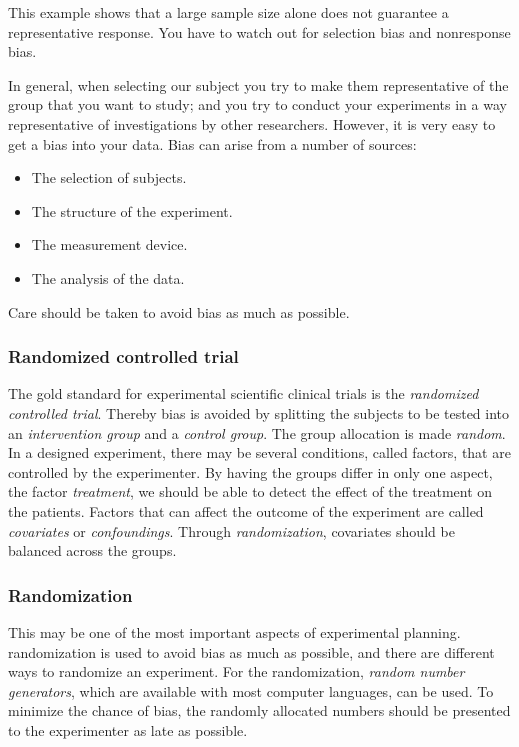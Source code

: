This example shows that a large sample size alone does not guarantee a representative response. You have to watch out for selection bias and nonresponse bias.

In general, when selecting our subject you try to make them representative of the group that you want to study; and you try to conduct your experiments in a way representative of investigations by other researchers. However, it is very easy to get a bias into your data. Bias can arise from a number of sources:

\begin{itemize}
  \item The selection of subjects.
  \item The structure of the experiment.
  \item The measurement device.
  \item The analysis of the data.
\end{itemize}

Care should be taken to avoid bias as much as possible.

\subsubsection{Randomized controlled trial} 
The gold standard for experimental scientific clinical trials is the \emph{randomized controlled trial}. Thereby bias is avoided by splitting the subjects to be tested into an \emph{intervention group} and a \emph{control group}. The group allocation is made \emph{random}.
In a designed experiment, there may be several conditions, called factors, that are controlled by the experimenter. By having the groups differ in only one aspect, the factor \emph{treatment}, we should be able to detect the effect of the treatment on the patients.
Factors that can affect the outcome of the experiment are called \emph{covariates} or \emph{confoundings}. Through \emph{randomization}, covariates should be balanced across the groups.

\subsubsection{Randomization} 
This may be one of the most important aspects of experimental planning. \Gls{randomization} is used to avoid bias as much as possible, and there are different ways to randomize an experiment. For the randomization, \emph{random number generators}, which are available with most computer languages, can be used. To minimize the chance of bias, the randomly allocated numbers should be presented to the experimenter as late as possible.

